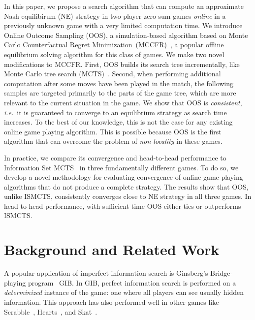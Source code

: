 \documentclass{aamas2015}
\newcommand{\ie}{{\it i.e.}~}
\begin{document}
In this paper, we propose a search algorithm that can compute an approximate Nash equilibirum (NE) strategy in two-player zero-sum games {\it online} in a previously unknown game with a very limited computation time. 
We introduce Online Outcome Sampling (OOS), a simulation-based algorithm based on Monte Carlo Counterfactual Regret Minimization~(MCCFR)~\cite{Lanctot09Sampling}, a popular offline equilibrium solving algorithm for this class of games. 
We make two novel modifications to MCCFR. First, OOS builds its search tree incrementally, like Monte Carlo tree search 
(MCTS)~\cite{Coulom06Efficient,UCT,mctssurvey}. Second, when performing additional computation after some moves have been played in the match, the following samples are targeted primarily to the parts of the game tree, which are more relevant to the current situation in the game.
We show that OOS is {\it consistent}, \ie it is guaranteed to converge to an equilibrium strategy as search time increases. To the best of our knowledge, this is not the case for any existing online game playing algorithm. This is possible because OOS is the first algorithm that can overcome the problem of \emph{non-locality} in these games.

In practice, we compare its convergence and head-to-head performance to Information Set 
MCTS~\cite{Cowling12ISMCTS,Whitehouse13Integrating,Lisy14selection} in three fundamentally different games. 
To do so, we develop a novel methodology for evaluating convergence of online game playing algorithms that do not produce a complete strategy. 
The results show that OOS, unlike ISMCTS, consistently converges close to NE strategy in all three games. In head-to-head performance, with sufficient time OOS either ties or outperforms ISMCTS. 

\section{Background and Related Work}

A popular application of imperfect information search is Ginsberg's Bridge-playing program~\cite{Ginsberg96Partition,Ginsberg01} GIB. 
In GIB, perfect information search is performed on a {\it determinized} instance of the game: one where all players can see usually hidden information. 
This approach has also performed well in other games like Scrabble~\cite{Sheppard02World}, 
Hearts~\cite{Sturtevant08An}, and Skat~\cite{Buro09Improving}. 
\end{document}
